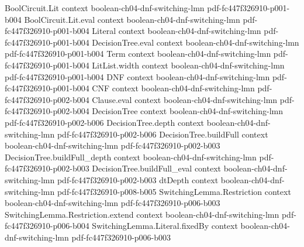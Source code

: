 \begin{lemma}
\label{LMN.and_of_gates_has_cnf}
\leanok
{}
\proofstep
  {BoolCircuit.Lit}
  {context}
  {boolean-ch04-dnf-switching-lmn}
  {pdf-fc447f326910-p001-b004}
\proofstep
  {BoolCircuit.Lit.eval}
  {context}
  {boolean-ch04-dnf-switching-lmn}
  {pdf-fc447f326910-p001-b004}
\proofstep
  {Literal}
  {context}
  {boolean-ch04-dnf-switching-lmn}
  {pdf-fc447f326910-p001-b004}
\proofstep
  {DecisionTree.eval}
  {context}
  {boolean-ch04-dnf-switching-lmn}
  {pdf-fc447f326910-p001-b004}
\proofstep
  {Term}
  {context}
  {boolean-ch04-dnf-switching-lmn}
  {pdf-fc447f326910-p001-b004}
\proofstep
  {LitList.width}
  {context}
  {boolean-ch04-dnf-switching-lmn}
  {pdf-fc447f326910-p001-b004}
\proofstep
  {DNF}
  {context}
  {boolean-ch04-dnf-switching-lmn}
  {pdf-fc447f326910-p001-b004}
\proofstep
  {CNF}
  {context}
  {boolean-ch04-dnf-switching-lmn}
  {pdf-fc447f326910-p002-b004}
\proofstep
  {Clause.eval}
  {context}
  {boolean-ch04-dnf-switching-lmn}
  {pdf-fc447f326910-p002-b004}
\proofstep
  {DecisionTree}
  {context}
  {boolean-ch04-dnf-switching-lmn}
  {pdf-fc447f326910-p002-b006}
\proofstep
  {DecisionTree.depth}
  {context}
  {boolean-ch04-dnf-switching-lmn}
  {pdf-fc447f326910-p002-b006}
\proofstep
  {DecisionTree.buildFull}
  {context}
  {boolean-ch04-dnf-switching-lmn}
  {pdf-fc447f326910-p002-b003}
\proofstep
  {DecisionTree.buildFull_depth}
  {context}
  {boolean-ch04-dnf-switching-lmn}
  {pdf-fc447f326910-p002-b003}
\proofstep
  {DecisionTree.buildFull_eval}
  {context}
  {boolean-ch04-dnf-switching-lmn}
  {pdf-fc447f326910-p002-b003}
\proofstep
  {dtDepth}
  {context}
  {boolean-ch04-dnf-switching-lmn}
  {pdf-fc447f326910-p008-b005}
\proofstep
  {SwitchingLemma.Restriction}
  {context}
  {boolean-ch04-dnf-switching-lmn}
  {pdf-fc447f326910-p006-b003}
\proofstep
  {SwitchingLemma.Restriction.extend}
  {context}
  {boolean-ch04-dnf-switching-lmn}
  {pdf-fc447f326910-p006-b004}
\proofstep
  {SwitchingLemma.Literal.fixedBy}
  {context}
  {boolean-ch04-dnf-switching-lmn}
  {pdf-fc447f326910-p006-b003}

\end{lemma}
